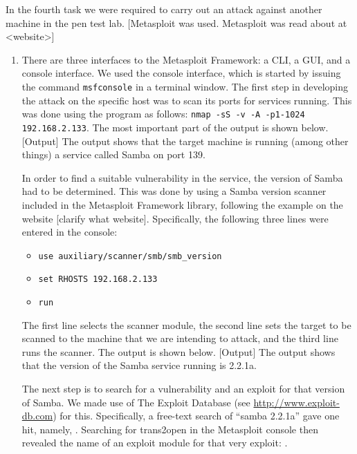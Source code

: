In the fourth task we were required to carry out an attack against another machine in the pen test lab. [Metasploit was used. Metasploit was read about at <website>]
\begin{enumerate}
\item %
  There are three interfaces to the Metasploit Framework: a CLI, a GUI, and a console interface\cite{}. We used the console interface, which is started by issuing the command \lstinline{msfconsole} in a terminal window.
  The first step in developing the attack on the specific host was to scan its ports for services running. This was done using the program  as follows: \lstinline{nmap -sS -v -A -p1-1024 192.168.2.133}. The most important part of the output is shown below.
[Output]
The output shows that the target machine is running (among other things) a service called Samba on port 139.

In order to find a suitable vulnerability in the service, the version of Samba had to be determined. This was done by using a Samba version scanner included in the Metasploit Framework library, following the example on the website [clarify what website]. Specifically, the following three lines were entered in the console:
\begin{itemize}
\item \lstinline{use auxiliary/scanner/smb/smb_version}
\item \lstinline{set RHOSTS 192.168.2.133}
\item \lstinline{run}
\end{itemize}
The first line selects the scanner module, the second line sets the target to be scanned to the machine that we are intending to attack, and the third line runs the scanner. The output is shown below.
[Output]
The output shows that the version of the Samba service running is 2.2.1a.

The next step is to search for a vulnerability and an exploit for that version of Samba. We made use of The Exploit Database (see \url{http://www.exploit-db.com}) for this. Specifically, a free-text search of ``samba 2.2.1a'' gave one hit, namely, . Searching for trans2open in the Metasploit console then revealed the name of an exploit module for that very exploit: .


\end{enumerate}
